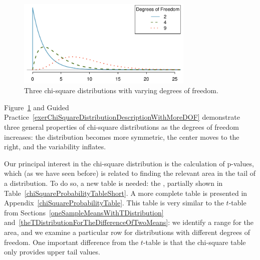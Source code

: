 \begin{figure}[h]
\centering
\includegraphics[width=0.75\textwidth]{ch_inference_for_props/figures/chiSquareDistributionWithInceasingDF/chiSquareDistributionWithInceasingDF}
\caption{Three chi-square distributions with varying degrees of freedom.}
\label{chiSquareDistributionWithInceasingDF}
\end{figure}

Figure~\ref{chiSquareDistributionWithInceasingDF} and Guided Practice~\ref{exerChiSquareDistributionDescriptionWithMoreDOF} demonstrate three general properties of chi-square distributions as the degrees of freedom increases: the distribution becomes more symmetric, the center moves to the right, and the variability inflates.

Our principal interest in the chi-square distribution is the calculation of p-values, which (as we have seen before) is related to finding the relevant area in the tail of a distribution. To do so, a new table is needed: the , partially shown in Table~\ref{chiSquareProbabilityTableShort}. A more complete table is presented in Appendix~\vref{chiSquareProbabilityTable}. This table is very similar to the $t$-table from Sections~\ref{oneSampleMeansWithTDistribution} and~\ref{theTDistributionForTheDifferenceOfTwoMeans}: we identify a range for the area, and we examine a particular row for distributions with different degrees of freedom. One important difference from the $t$-table is that the chi-square table only provides upper tail values.

